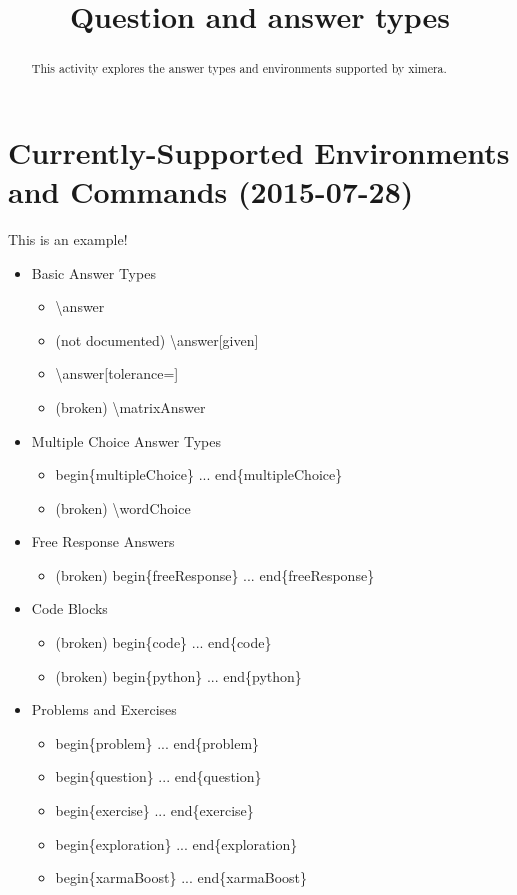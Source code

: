 \documentclass{ximera}
\title{Question and answer types}
\begin{document}
\begin{abstract}
  This activity explores the answer types and environments supported by ximera.
\end{abstract}

\maketitle

\section{Currently-Supported Environments and Commands (2015-07-28)}

\begin{example}
This is an example!

\begin{itemize}
\item Basic Answer Types
  \begin{itemize}
    \item \textbackslash answer
    \item (not documented) \textbackslash answer[given]
    \item \textbackslash answer[tolerance=]
    \item (broken) \textbackslash matrixAnswer  
  \end{itemize}
\item Multiple Choice Answer Types
  \begin{itemize}
    \item begin\{multipleChoice\} ... end\{multipleChoice\}
    \item (broken) \textbackslash wordChoice
  \end{itemize}    
\item Free Response Answers
  \begin{itemize}   
    \item (broken) begin\{freeResponse\} ... end\{freeResponse\}
  \end{itemize}
\item Code Blocks
  \begin{itemize}
    \item (broken) begin\{code\} ... end\{code\}
    \item (broken) begin\{python\} ... end\{python\}
  \end{itemize}
\item Problems and Exercises
  \begin{itemize}
    \item begin\{problem\} ... end\{problem\}
    \item begin\{question\} ... end\{question\}
    \item begin\{exercise\} ... end\{exercise\}
    \item begin\{exploration\} ... end\{exploration\}
    \item begin\{xarmaBoost\} ... end\{xarmaBoost\}
  \end{itemize}
\end{itemize}

\end{example}
\end{document}

